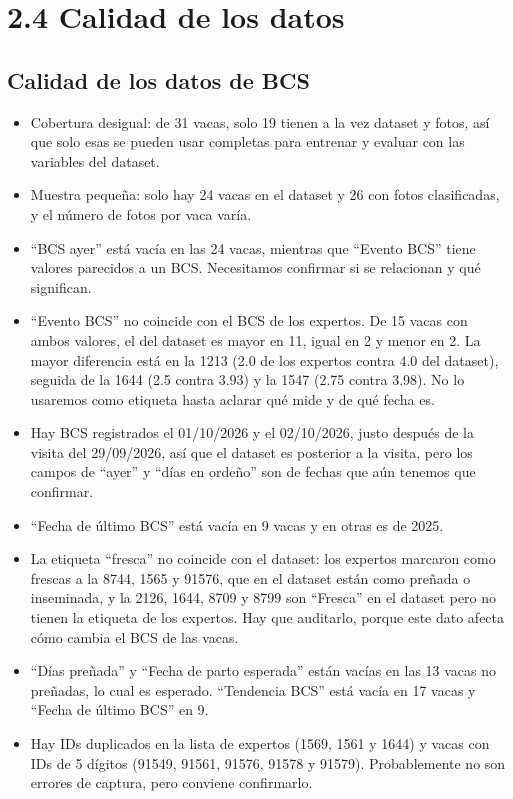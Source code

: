 \documentclass[11pt,letterpaper,DIV=12]{scrartcl}
\begin{document}
\section{2.4 Calidad de los datos}

\subsection{Calidad de los datos de BCS}

\begin{itemize}
  \item Cobertura desigual: de 31 vacas, solo 19 tienen a la vez dataset y fotos, así que solo esas se pueden usar completas para entrenar y evaluar con las variables del dataset.
  \item Muestra pequeña: solo hay 24 vacas en el dataset y 26 con fotos clasificadas, y el número de fotos por vaca varía.
  \item ``BCS ayer'' está vacía en las 24 vacas, mientras que ``Evento BCS'' tiene valores parecidos a un BCS. Necesitamos confirmar si se relacionan y qué significan.
  \item ``Evento BCS'' no coincide con el BCS de los expertos. De 15 vacas con ambos valores, el del dataset es mayor en 11, igual en 2 y menor en 2. La mayor diferencia está en la 1213 (2.0 de los expertos contra 4.0 del dataset), seguida de la 1644 (2.5 contra 3.93) y la 1547 (2.75 contra 3.98). No lo usaremos como etiqueta hasta aclarar qué mide y de qué fecha es.
  \item Hay BCS registrados el 01/10/2026 y el 02/10/2026, justo después de la visita del 29/09/2026, así que el dataset es posterior a la visita, pero los campos de ``ayer'' y ``días en ordeño'' son de fechas que aún tenemos que confirmar.
  \item ``Fecha de último BCS'' está vacía en 9 vacas y en otras es de 2025.
  \item La etiqueta ``fresca'' no coincide con el dataset: los expertos marcaron como frescas a la 8744, 1565 y 91576, que en el dataset están como preñada o inseminada, y la 2126, 1644, 8709 y 8799 son ``Fresca'' en el dataset pero no tienen la etiqueta de los expertos. Hay que auditarlo, porque este dato afecta cómo cambia el BCS de las vacas.
  \item ``Días preñada'' y ``Fecha de parto esperada'' están vacías en las 13 vacas no preñadas, lo cual es esperado. ``Tendencia BCS'' está vacía en 17 vacas y ``Fecha de último BCS'' en 9.
  \item Hay IDs duplicados en la lista de expertos (1569, 1561 y 1644) y vacas con IDs de 5 dígitos (91549, 91561, 91576, 91578 y 91579). Probablemente no son errores de captura, pero conviene confirmarlo.
\end{itemize}
\end{document}
